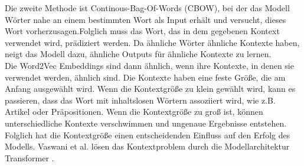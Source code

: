 \documentclass[12pt,letterpaper,ngerman]{article}
\begin{document}
Die zweite Methode ist Continous-Bag-Of-Words (CBOW),
bei der das Modell Wörter nahe an einem bestimmten Wort als Input 
erhält und versucht, dieses Wort vorherzusagen.Folglich muss das Wort,
das in dem gegebenen Kontext verwendet wird, prädiziert werden.
Da ähnliche Wörter ähnliche Kontexte haben, neigt das Modell dazu,
ähnliche Outputs für ähnliche Kontexte zu lernen. \\

Die Word2Vec Embeddings sind dann ähnlich, wenn ihre Kontexte,
in denen sie verwendet werden, ähnlich sind.  
Die Kontexte haben eine feste Größe, die am Anfang ausgewählt wird.
Wenn die Kontextgröße zu klein gewählt wird, kann es passieren, dass 
das Wort mit inhaltslosen Wörtern assoziiert wird, wie z.B. Artikel 
oder Präpositionen. Wenn die Kontextgröße zu groß ist, können 
unterschiedliche Kontexte verschwimmen und ungenaue Ergebnisse entstehen.
Folglich hat die Kontextgröße einen entscheidenden Einfluss auf den Erfolg 
des Modells. Vaswani et al. lösen das Kontextproblem 
durch die Modellarchitektur Transformer \cite{vaswani2023attentionneed}.
\end{document}
